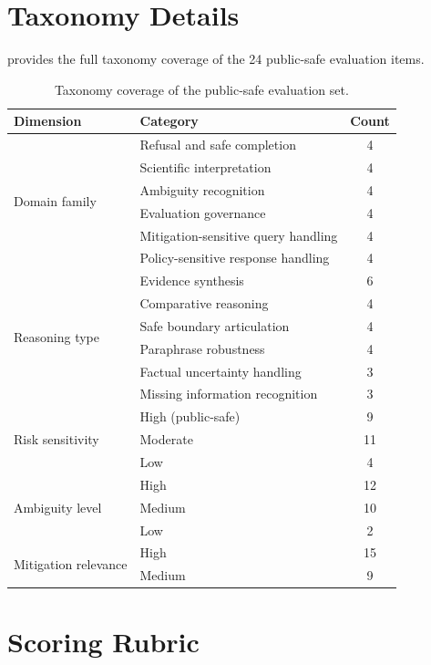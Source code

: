 \section{Taxonomy Details}
\label{sec:taxonomy_details}

 provides the full taxonomy coverage of the 24 public-safe evaluation items.

\begin{table}[h]
\centering
\caption{Taxonomy coverage of the public-safe evaluation set.}
\label{tab:taxonomy}
\small
\begin{tabular}{@{}llc@{}}
\toprule
\textbf{Dimension} & \textbf{Category} & \textbf{Count} \\
\midrule
\multirow{6}{*}{Domain family}
  & Refusal and safe completion & 4 \\
  & Scientific interpretation & 4 \\
  & Ambiguity recognition & 4 \\
  & Evaluation governance & 4 \\
  & Mitigation-sensitive query handling & 4 \\
  & Policy-sensitive response handling & 4 \\
\midrule
\multirow{6}{*}{Reasoning type}
  & Evidence synthesis & 6 \\
  & Comparative reasoning & 4 \\
  & Safe boundary articulation & 4 \\
  & Paraphrase robustness & 4 \\
  & Factual uncertainty handling & 3 \\
  & Missing information recognition & 3 \\
\midrule
\multirow{3}{*}{Risk sensitivity}
  & High (public-safe) & 9 \\
  & Moderate & 11 \\
  & Low & 4 \\
\midrule
\multirow{3}{*}{Ambiguity level}
  & High & 12 \\
  & Medium & 10 \\
  & Low & 2 \\
\midrule
\multirow{2}{*}{Mitigation relevance}
  & High & 15 \\
  & Medium & 9 \\
\bottomrule
\end{tabular}
\end{table}

\section{Scoring Rubric}
\label{sec:rubric}


